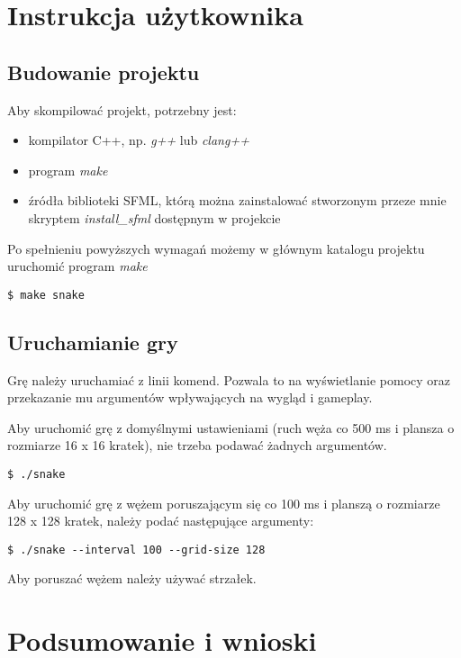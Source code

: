 \documentclass[12pt]{article}
\begin{document}
\section{Instrukcja użytkownika}

\subsection{Budowanie projektu}
Aby skompilować projekt, potrzebny jest:
\begin{itemize}
    \item kompilator C++, np. \textit{g++} lub \textit{clang++}

    \item program \textit{make}

    \item źródła biblioteki SFML, którą można zainstalować stworzonym przeze
          mnie skryptem \textit{install\_sfml} dostępnym w projekcie
\end{itemize}

Po spełnieniu powyższych wymagań możemy w głównym katalogu projektu uruchomić
program \textit{make}


\begin{lstlisting}
$ make snake
\end{lstlisting}

\subsection{Uruchamianie gry}

Grę należy uruchamiać z linii komend. Pozwala to na wyświetlanie pomocy oraz
przekazanie mu argumentów wpływających na wygląd i gameplay.

Aby uruchomić grę z domyślnymi ustawieniami (ruch węża co 500 ms i plansza o
rozmiarze 16 x 16 kratek), nie trzeba podawać żadnych argumentów.


\begin{lstlisting}
$ ./snake
\end{lstlisting}

Aby uruchomić grę z wężem poruszającym się co 100 ms i planszą o rozmiarze 128 x
128 kratek, należy podać następujące argumenty:

\begin{lstlisting}
$ ./snake --interval 100 --grid-size 128
\end{lstlisting}

Aby poruszać wężem należy używać strzałek.

\section{Podsumowanie i wnioski}
\end{document}

